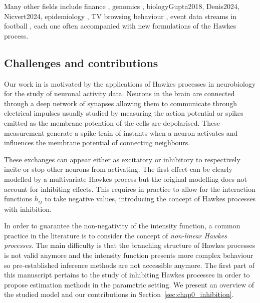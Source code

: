 
    Many other fields include finance \parencite{Embrechts2011, Bacry2013, Lotz2024}, genomics \parencite{Reynaud2010, Carstensen2010}, biology{Gupta2018, Denis2024, Nicvert2024}, epidemiology \parencite{Rizoiu2018, Chiang2022}, TV browsing behaviour \parencite{Xu2016}, event data streams in football \parencite{Baouan2023, Narayanan2023}, 
    each one often accompanied with new formulations of the Hawkes process.

    \subsection{Challenges and contributions}

    Our work in is motivated by the applications of Hawkes processes in neurobiology for the study of neuronal activity data.
    Neurons in the brain are connected through a deep network of synapses allowing them to communicate through electrical impulses usually studied by measuring the action potential or spikes emitted as the membrane potention of the cells are depolarised.
    These measurement generate a spike train of instants when a neuron activates and influences the membrane potential of connecting neighbours.

    These exchanges can appear either as excitatory or inhibitory to respectively incite or stop other neurons from activating.
    The first effect can be clearly modelled by a multivariate Hawkes process but the original modelling does not account for inhibiting effects.
    This requires in practice to allow for the interaction functions $h_{ij}$ to take negative values, introducing the concept of Hawkes processes with inhibition.

    In order to guarantee the non-negativity of the intensity function, a common practice in the literature is to consider the concept of \emph{non-linear Hawkes processes}.
    The main difficulty is that the branching structure of Hawkes processes is not valid anymore and the intensity function presents more complex behaviour so pre-established inference methods are not accessible anymore.
    The first part of this manuscript pertains to the study of inhibiting Hawkes processes in order to propose estimation methods in the parametric setting.
    We present an overview of the studied model and our contributions in Section~\ref{sec:chap0_inhibition}.
    

